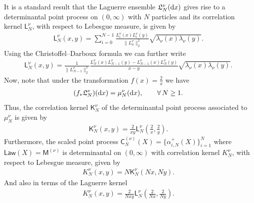 It is a standard result that the Laguerre ensemble $\mathfrak{L}_N^{\nu}({\rm d}x)$ gives rise to a determinantal point process on $(0,\infty)$ with $N$ particles and its correlation kernel $\mathsf{L}_{N}^{\nu}$, with respect to Lebesgue measure, is given by
\begin{gather*}
\mathsf{L}_{N}^{\nu}(x,y)=\sum_{i=0}^{N-1}\frac{L_i^{\nu}(x)L_i^{\nu}(y)}{\|L_n^{\nu}\|_2^2}\sqrt{\lambda_\nu(x)\lambda_\nu(y)}.
\end{gather*}
Using the Christoffel--Darboux formula we can further write
\begin{gather*}
\mathsf{L}_{N}^{\nu}(x,y)=\frac{1}{\|L_{N-1}^{\nu}\|_2^2}\frac{L_{N}^{\nu}(x)L_{N-1}^{\nu}(y)-L_{N-1}^{\nu}(x)L_{N}^{\nu}(y)}{x-y}\sqrt{\lambda_\nu(x)\lambda_\nu(y)}.
\end{gather*}
Now, note that under the transformation $f(x)=\frac{2}{x}$ we have
\begin{gather*}
(f_*\mathfrak{L}_N^{\nu})({\rm d}x)=\mu_N^{\nu}({\rm d}x), \qquad \forall\, N \ge 1.
\end{gather*}
Thus, the correlation kernel $\mathsf{K}_N^{\nu}$ of the determinantal point process associated to $\mu_N^{\nu}$ is given by
\begin{gather*}
\mathsf{K}_N^{\nu}(x,y)=\frac{2}{xy}\mathsf{L}_N^{\nu}\left(\frac{2}{x},\frac{2}{y}\right).
\end{gather*}
Furthermore, the scaled point process $\mathsf{C}_N^{(\nu)}(X)=\{\alpha_{i,N}^+(X) \}_{i=1}^N$ where $\mathsf{Law}(X)=\mathsf{M}^{(\nu)}$ is deter\-minantal on $(0,\infty)$ with correlation kernel $K_N^{\nu}$, with respect to Lebesgue measure, given by
\begin{gather*}
K_N^{\nu}(x,y)=N\mathsf{K}_N^{\nu}(Nx,Ny).
\end{gather*}
And also in terms of the Laguerre kernel
\begin{gather}\label{KernelRelation}
K_N^{\nu}(x,y)=\frac{2}{Nxy}\mathsf{L}_N^{\nu}\left(\frac{2}{Nx},\frac{2}{Ny}\right).
\end{gather}

